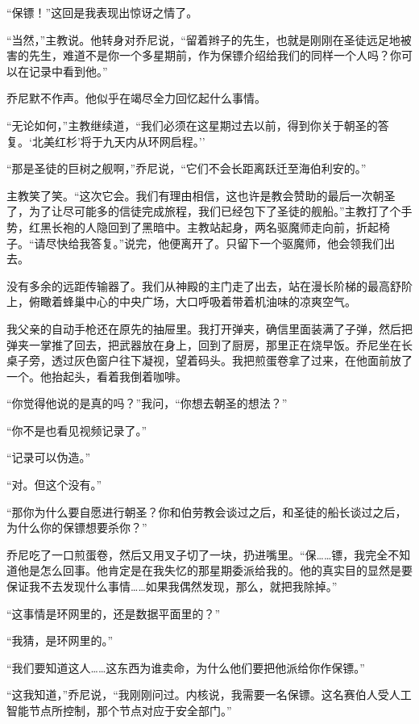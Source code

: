 \documentclass[AutoFakeBold=true]{book}
\begin{document}
``保镖！''这回是我表现出惊讶之情了。

``当然，''主教说。他转身对乔尼说，``留着辫子的先生，也就是刚刚在圣徒远足地被害的先生，难道不是你一个多星期前，作为保镖介绍给我们的同样一个人吗？你可以在记录中看到他。''

乔尼默不作声。他似乎在竭尽全力回忆起什么事情。

``无论如何，''主教继续道，``我们必须在这星期过去以前，得到你关于朝圣的答复。`北美红杉'将于九天内从环网启程。''

``那是圣徒的巨树之舰啊，''乔尼说，``它们不会长距离跃迁至海伯利安的。''

主教笑了笑。``这次它会。我们有理由相信，这也许是教会赞助的最后一次朝圣了，为了让尽可能多的信徒完成旅程，我们已经包下了圣徒的舰船。''主教打了个手势，红黑长袍的人隐回到了黑暗中。主教站起身，两名驱魔师走向前，折起椅子。``请尽快给我答复。''说完，他便离开了。只留下一个驱魔师，他会领我们出去。

没有多余的远距传输器了。我们从神殿的主门走了出去，站在漫长阶梯的最高舒阶上，俯瞰着蜂巢中心的中央广场，大口呼吸着带着机油味的凉爽空气。

\vspace*{1em}

我父亲的自动手枪还在原先的抽屉里。我打开弹夹，确信里面装满了子弹，然后把弹夹一掌推了回去，把武器放在身上，回到了厨房，那里正在烧早饭。乔尼坐在长桌子旁，透过灰色窗户往下凝视，望着码头。我把煎蛋卷拿了过来，在他面前放了一个。他抬起头，看着我倒着咖啡。

``你觉得他说的是真的吗？''我问，``你想去朝圣的想法？''

``你不是也看见视频记录了。''

``记录可以伪造。''

``对。但这个没有。''

``那你为什么要自愿进行朝圣？你和伯劳教会谈过之后，和圣徒的船长谈过之后，为什么你的保镖想要杀你？''

乔尼吃了一口煎蛋卷，然后又用叉子切了一块，扔进嘴里。``保……镖，我完全不知道他是怎么回事。他肯定是在我失忆的那星期委派给我的。他的真实目的显然是要保证我不去发现什么事情……如果我偶然发现，那么，就把我除掉。''

``这事情是环网里的，还是数据平面里的？''

``我猜，是环网里的。''

``我们要知道这人……这东西为谁卖命，为什么他们要把他派给你作保镖。''

``这我知道，''乔尼说，``我刚刚问过。内核说，我需要一名保镖。这名赛伯人受人工智能节点所控制，那个节点对应于安全部门。''
\end{document}
